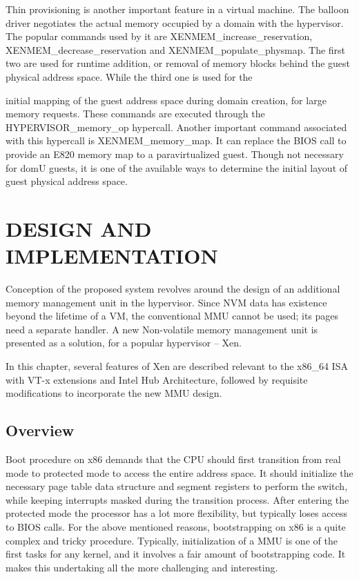 Thin provisioning is another important feature in a virtual machine. The balloon driver negotiates the actual memory occupied by a domain with the hypervisor. The popular commands used by it are XENMEM\_increase\_reservation, XENMEM\_decrease\_reservation and XENMEM\_populate\_physmap. The first two are used for runtime addition, or removal of memory blocks behind the guest physical address space. While the third one is used for the

initial mapping of the guest address space during domain creation, for large memory requests. These commands are executed through the HYPERVISOR\_memory\_op hypercall. Another important command associated with this hypercall is XENMEM\_memory\_map. It can replace the BIOS call to provide an E820 memory map to a paravirtualized guest. Though not necessary for domU guests, it is one of the available ways to determine the initial layout of guest physical address space. 


\chapter{\uppercase{Design and Implementation}}

Conception of the proposed system revolves around the design of an additional memory management unit in the hypervisor. Since NVM data has existence beyond the lifetime of a VM, the conventional MMU cannot be used; its pages need a separate handler. A new Non-volatile memory management unit is presented as a solution, for a popular hypervisor -- Xen.

In this chapter, several features of Xen are described relevant to the x86\_64 ISA with VT-x extensions and Intel Hub Architecture, followed by requisite modifications to incorporate the new MMU design. 

\section{Overview}
Boot procedure on x86 demands that the CPU should first transition from real mode to protected mode to access the entire address space. It should initialize the necessary page table data structure and segment registers to perform the switch, while keeping interrupts masked during the transition process. After entering the protected mode the processor has a lot more flexibility, but typically loses access to BIOS calls. For the above mentioned reasons, bootstrapping on x86 is a quite complex and tricky procedure. Typically, initialization of a MMU is one of the first tasks for any kernel, and it involves a fair amount of bootstrapping code. It makes this undertaking all the more challenging and interesting.

